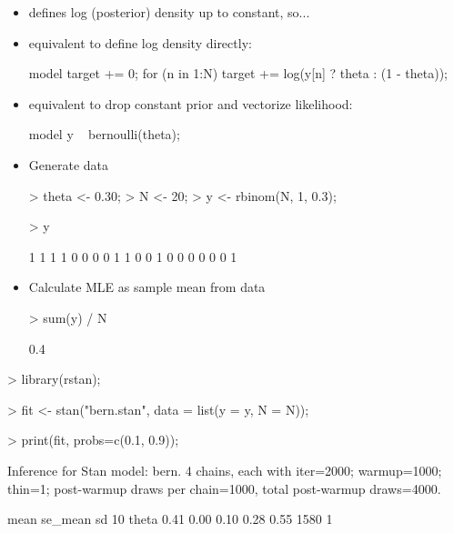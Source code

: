 \documentclass[10pt]{report}
\begin{document}
%
\begin{itemize}
\item defines log (posterior) density up to constant, so...
\item equivalent to define log density directly:
\begin{stancode}
model {
  target += 0;
  for (n in 1:N)
    target += log(y[n] ? theta : (1 - theta));
}
\end{stancode}
\item equivalent to drop constant prior and vectorize
  likelihood:
\begin{stancode}
model {
  y ~ bernoulli(theta);
}
\end{stancode}
\end{itemize}


%
\begin{itemize}
\item Generate data
\begin{codein}
> theta <- 0.30;
> N <- 20;
> y <- rbinom(N, 1, 0.3);

> y
\end{codein}
\begin{codeout}
 [1] 1 1 1 1 0 0 0 0 1 1 0 0 1 0 0 0 0 0 0 1
\end{codeout}
\item Calculate MLE as sample mean from data
\begin{codein}
> sum(y) / N
\end{codein}
\begin{codeout}
[1] 0.4
\end{codeout}
\end{itemize}


%
\begin{codein}
> library(rstan);

> fit <- stan("bern.stan",
              data = list(y = y, N = N));

> print(fit, probs=c(0.1, 0.9));
\end{codein}
\begin{codeout}
Inference for Stan model: bern.
4 chains, each with iter=2000; warmup=1000; thin=1;
post-warmup draws per chain=1000,
total post-warmup draws=4000.

        mean se_mean   sd    10%
theta   0.41    0.00 0.10   0.28   0.55  1580    1
\end{codeout}
\end{document}

